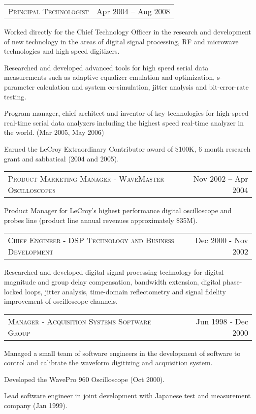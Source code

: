 \documentclass[10pt,letterpaper]{extarticle}
\makeatletter
\newcommand{\headerrow}[2]
{\begin{tabular*}{\linewidth}{l@{\extracolsep{\fill}}r}
	#1 &
	#2 \\
\end{tabular*}}
\makeatother
\begin{document}
	\headerrow
	{\large \textsc{Principal  Technologist}}
	{Apr 2004 – Aug 2008}\vspace{-\topsep}\begin{itemize*}
	\item Worked directly for the Chief Technology Officer in the research and development
	of new technology in the areas of digital signal processing, RF and microwave
	 technologies and high speed digitizers.
	\item Researched and developed advanced tools for high speed serial data measurements
	 such as adaptive equalizer emulation and optimization, s-parameter calculation and
	 system co-simulation, jitter analysis and bit-error-rate testing.
	\item Program manager, chief architect and inventor of key technologies for high-speed
	real-time serial data analyzers including the highest speed real-time analyzer in the
	world. (Mar 2005,  May 2006)
	\item Earned the LeCroy Extraordinary Contributor award of \$100K, 6 month research grant and sabbatical (2004 and 2005).
	\end{itemize*}\vspace{-\topsep}
	\headerrow
	{\large \textsc{Product Marketing Manager - WaveMaster Oscilloscopes}}
	{Nov 2002 – Apr 2004}\vspace{-\topsep}\begin{itemize*}
	\item Product Manager for LeCroy's highest performance digital oscilloscope and probes
	line (product line annual revenues approximately \$35M).
	\end{itemize*}\vspace{-\topsep}
	\headerrow
	{\large \textsc{Chief Engineer - DSP Technology and Business Development}}
	{Dec 2000 - Nov 2002}\vspace{-\topsep}\begin{itemize*}
	\item Researched and developed digital signal processing technology for digital magnitude 
	and group delay compensation, bandwidth extension, digital phase-locked loops, jitter 
	analysis, time-domain reflectometry and signal fidelity improvement of oscilloscope 
	channels.
	\end{itemize*}\vspace{-\topsep}
	\headerrow
	{\large \textsc{Manager - Acquisition Systems Software Group}}
	{Jun 1998 - Dec 2000}\vspace{-\topsep}\begin{itemize*}
	\item Managed a small team of software engineers in the development of software to
	control and calibrate the waveform digitizing and acquisition system.
	\item Developed the WavePro 960 Oscilloscope (Oct 2000).
	\item Lead software engineer in joint development with Japanese test and measurement 
	company (Jan 1999).
	\end{itemize*}\vspace{-\topsep}
\end{document}
